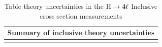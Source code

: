 \begin{table}[!htb]
\begin{center}
\small
\label{tab:SystOverviewTheo_bkg}
\caption{Table theory uncertainties in the $\mathrm{H}\rightarrow4\ell$ Inclusive cross section measurements}
\begin{tabular}{|lc|}
\hline %
\hline %
\multicolumn{2}{|c|}{\textbf{Summary of inclusive theory uncertainties}} \\
\hline %
\hline %
\vspace{-0.4cm} & \\

\end{tabular}
\end{center}
\end{table}
